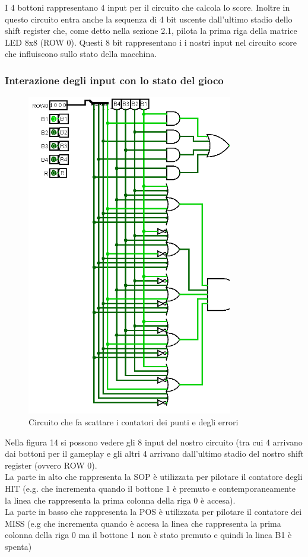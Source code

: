 \documentclass[11pt]{article}
\begin{document}
I 4 bottoni rappresentano 4 input per il circuito che calcola lo score.
Inoltre in questo circuito entra anche la sequenza di 4 bit uscente dall'ultimo stadio
dello shift register che, come detto nella sezione 2.1, pilota la prima riga
della matrice LED 8x8 (ROW 0).
Questi 8 bit rappresentano i i nostri input nel circuito score che influiscono
sullo stato della macchina.

\pagebreak
\subsubsection{Interazione degli input con lo stato del gioco}

\begin{figure}[!htpb]
\centering
\includegraphics[width=0.8\textwidth, center]{immagini/SOP_POS_score}
\caption{Circuito che fa scattare i contatori dei punti e degli errori}
\label{fig:fig14}
\end{figure}

Nella figura 14 si possono vedere gli 8 input del nostro circuito (tra cui 4 arrivano dai bottoni per il gameplay
e gli altri 4 arrivano dall'ultimo stadio del nostro shift register (ovvero ROW 0).
\\La parte in alto che rappresenta la SOP è utilizzata per pilotare il contatore degli HIT (e.g. che incrementa 
quando il bottone 1 è premuto e contemporaneamente la linea che rappresenta la prima colonna
della riga 0 è accesa).
\\La parte in basso che rappresenta la POS è utilizzata per pilotare il contatore dei MISS (e.g che incrementa quando
è accesa la linea che rappresenta la prima colonna della riga 0 ma il bottone 1 non è stato premuto e quindi la linea B1 è spenta)
\end{document}
